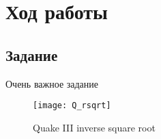 \chapter{Ход работы}

\section{Задание }

Очень важное задание

\begin{figure}[H]
  \centering
  \texttt{[image: Q\_rsqrt]}
  \caption{Quake III inverse square root}
  \label{fig:rsqrt}
\end{figure}

